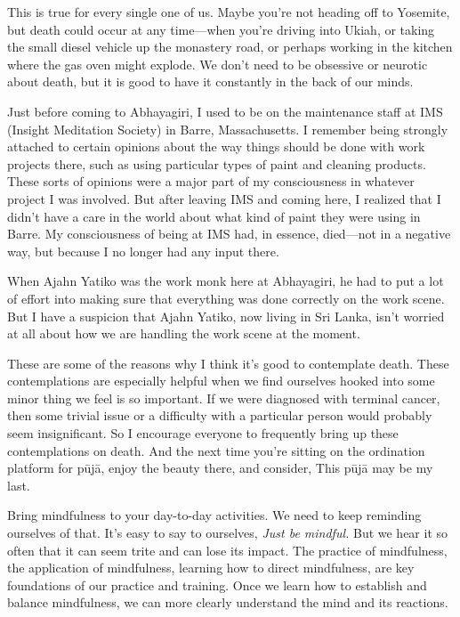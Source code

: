 This is true for every single one of us. Maybe you're not heading off 
to Yosemite, but death could occur at any time---when you're driving 
into Ukiah, or taking the small diesel vehicle up the monastery road, 
or perhaps working in the kitchen where the gas oven might explode. We 
don't need to be obsessive or neurotic about death, but it is good to 
have it constantly in the back of our minds.

Just before coming to Abhayagiri, I used to be on the maintenance staff 
at IMS (Insight Meditation Society) in Barre, Massachusetts. I remember 
being strongly attached to certain opinions about the way things should 
be done with work projects there, such as using particular types of 
paint and cleaning products. These sorts of opinions were a major part 
of my consciousness in whatever project I was involved. But after 
leaving IMS and coming here, I realized that I didn't have a care in 
the world about what kind of paint they were using in Barre. My 
consciousness of being at IMS had, in essence, died---not in a negative 
way, but because I no longer had any input there.

When Ajahn Yatiko was the work monk here at Abhayagiri, he had to put a 
lot of effort into making sure that everything was done correctly on 
the work scene. But I have a suspicion that Ajahn Yatiko, now living in 
Sri Lanka, isn't worried at all about how we are handling the work 
scene at the moment.

These are some of the reasons why I think it's good to contemplate 
death. These contemplations are especially helpful when we find 
ourselves hooked into some minor thing we feel is so important. If we 
were diagnosed with terminal cancer, then some trivial issue or a 
difficulty with a particular person would probably seem insignificant. 
So I encourage everyone to frequently bring up these contemplations on 
death. And the next time you're sitting on the ordination platform for 
pūjā, enjoy the beauty there, and consider, This pūjā may be my 
last.


Bring mindfulness to your day-to-day activities. We need to keep 
reminding ourselves of that. It's easy to say to ourselves, \emph{Just 
be mindful.} But we hear it so often that it can seem trite and can 
lose its impact. The practice of mindfulness, the application of 
mindfulness, learning how to direct mindfulness, are key foundations of 
our practice and training. Once we learn how to establish and balance 
mindfulness, we can more clearly understand the mind and its reactions.

